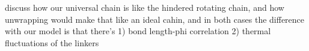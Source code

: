 \documentclass[%
 reprint,
superscriptaddress,
showpacs,preprintnumbers,
 amsmath,amssymb,
 aps,
 prl,
]{revtex4-1}
\newcommand{\RR}{\left\langle{}R^2\right\rangle{}}
\begin{document}
discuss how our universal chain is like the hindered rotating chain, and
how unwrapping would make that like an ideal cahin, and in both cases the
difference with our model is that there's 1) bond length-phi correlation 2)
thermal fluctuations of the linkers






\end{document}
